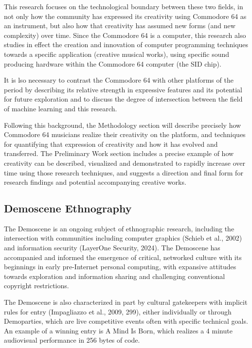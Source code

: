 \documentclass[10pt]{article}
\begin{document}
\begin{multicols*}{2}
This research focuses on the technological boundary between these two fields, in not only how the community has expressed its creativity using Commodore 64 as an instrument, but also how that creativity has assumed new forms (and new complexity) over time. Since the Commodore 64 is a computer, this research also studies in effect the creation and innovation of computer programming techniques towards a specific application (creative musical works), using specific sound producing hardware within the Commodore 64 computer (the SID chip).

It is lso necessary to contrast the Commodore 64 with other platforms of the period by describing its relative strength in expressive features and its potential for future exploration and to discuss the degree of intersection between the field of machine learning and this research.

Following this background, the Methodology section will describe precisely how Commodore 64 musicians realize their creativity on the platform, and techniques for quantifying that expression of creativity and how it has evolved and transferred. The Preliminary Work section includes a precise example of how creativity can be described, visualized and demonstrated to rapidly increase over time using those research techniques, and suggests a direction and final form for research findings and potential accompanying creative works.

\subsection{Demoscene Ethnography}

The Demoscene is an ongoing subject of ethnographic research, including the intersection with communities including computer graphics (Schieb et al., 2002) and information security (LayerOne Security, 2024). The Demoscene has accompanied and informed the emergence of critical, networked culture with its beginnings in early pre-Internet personal computing\cite{pioneers}, with expansive attitudes towards exploration and information sharing and challenging conventional copyright restrictions.

The Demoscene is also characterized in part by cultural gatekeepers with implicit rules for entry (Impagliazzo et al., 2009, 299), either individually or through Demoparties, which are live competitive events often with specific technical goals. An example of a winning entry is A Mind Is Born, which realizes a 4 minute audiovisual performance in 256 bytes of code\cite{amib}.


\end{multicols*}
\end{document}
